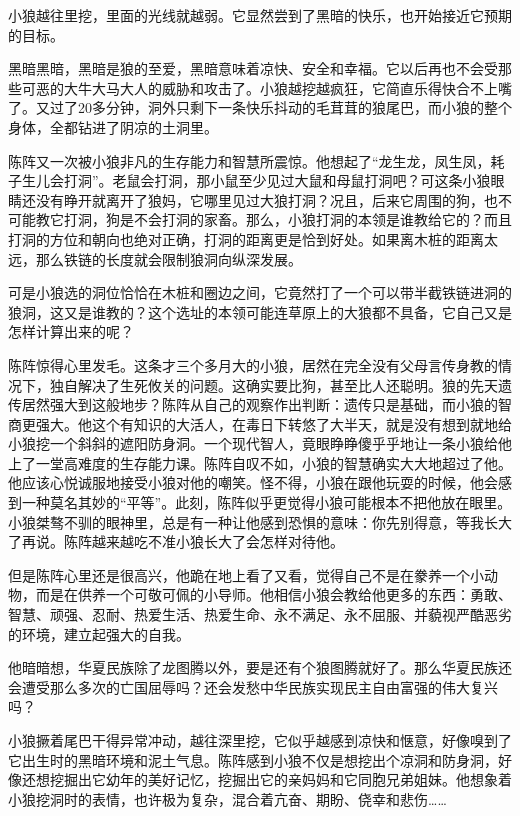 \par 小狼越往里挖，里面的光线就越弱。它显然尝到了黑暗的快乐，也开始接近它预期的目标。
\par 黑暗黑暗，黑暗是狼的至爱，黑暗意味着凉快、安全和幸福。它以后再也不会受那些可恶的大牛大马大人的威胁和攻击了。小狼越挖越疯狂，它简直乐得快合不上嘴了。又过了20多分钟，洞外只剩下一条快乐抖动的毛茸茸的狼尾巴，而小狼的整个身体，全都钻进了阴凉的土洞里。
\par 陈阵又一次被小狼非凡的生存能力和智慧所震惊。他想起了“龙生龙，凤生凤，耗子生儿会打洞”。老鼠会打洞，那小鼠至少见过大鼠和母鼠打洞吧？可这条小狼眼睛还没有睁开就离开了狼妈，它哪里见过大狼打洞？况且，后来它周围的狗，也不可能教它打洞，狗是不会打洞的家畜。那么，小狼打洞的本领是谁教给它的？而且打洞的方位和朝向也绝对正确，打洞的距离更是恰到好处。如果离木桩的距离太远，那么铁链的长度就会限制狼洞向纵深发展。
\par 可是小狼选的洞位恰恰在木桩和圈边之间，它竟然打了一个可以带半截铁链进洞的狼洞，这又是谁教的？这个选址的本领可能连草原上的大狼都不具备，它自己又是怎样计算出来的呢？
\par 陈阵惊得心里发毛。这条才三个多月大的小狼，居然在完全没有父母言传身教的情况下，独自解决了生死攸关的问题。这确实要比狗，甚至比人还聪明。狼的先天遗传居然强大到这般地步？陈阵从自己的观察作出判断：遗传只是基础，而小狼的智商更强大。他这个有知识的大活人，在毒日下转悠了大半天，就是没有想到就地给小狼挖一个斜斜的遮阳防身洞。一个现代智人，竟眼睁睁傻乎乎地让一条小狼给他上了一堂高难度的生存能力课。陈阵自叹不如，小狼的智慧确实大大地超过了他。他应该心悦诚服地接受小狼对他的嘲笑。怪不得，小狼在跟他玩耍的时候，他会感到一种莫名其妙的“平等”。此刻，陈阵似乎更觉得小狼可能根本不把他放在眼里。小狼桀骜不驯的眼神里，总是有一种让他感到恐惧的意味：你先别得意，等我长大了再说。陈阵越来越吃不准小狼长大了会怎样对待他。
\par 但是陈阵心里还是很高兴，他跪在地上看了又看，觉得自己不是在豢养一个小动物，而是在供养一个可敬可佩的小导师。他相信小狼会教给他更多的东西：勇敢、智慧、顽强、忍耐、热爱生活、热爱生命、永不满足、永不屈服、并藐视严酷恶劣的环境，建立起强大的自我。
\par 他暗暗想，华夏民族除了龙图腾以外，要是还有个狼图腾就好了。那么华夏民族还会遭受那么多次的亡国屈辱吗？还会发愁中华民族实现民主自由富强的伟大复兴吗？
\par 小狼撅着尾巴干得异常冲动，越往深里挖，它似乎越感到凉快和惬意，好像嗅到了它出生时的黑暗环境和泥土气息。陈阵感到小狼不仅是想挖出个凉洞和防身洞，好像还想挖掘出它幼年的美好记忆，挖掘出它的亲妈妈和它同胞兄弟姐妹。他想象着小狼挖洞时的表情，也许极为复杂，混合着亢奋、期盼、侥幸和悲伤……
